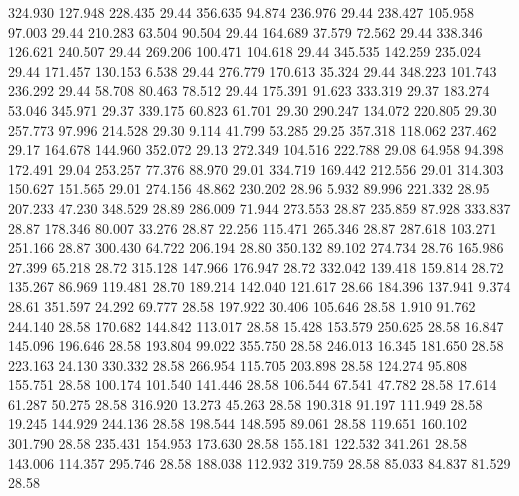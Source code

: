  324.930  127.948  228.435        29.44
 356.635   94.874  236.976        29.44
 238.427  105.958   97.003        29.44
 210.283   63.504   90.504        29.44
 164.689   37.579   72.562        29.44
 338.346  126.621  240.507        29.44
 269.206  100.471  104.618        29.44
 345.535  142.259  235.024        29.44
 171.457  130.153    6.538        29.44
 276.779  170.613   35.324        29.44
 348.223  101.743  236.292        29.44
  58.708   80.463   78.512        29.44
 175.391   91.623  333.319        29.37
 183.274   53.046  345.971        29.37
 339.175   60.823   61.701        29.30
 290.247  134.072  220.805        29.30
 257.773   97.996  214.528        29.30
   9.114   41.799   53.285        29.25
 357.318  118.062  237.462        29.17
 164.678  144.960  352.072        29.13
 272.349  104.516  222.788        29.08
  64.958   94.398  172.491        29.04
 253.257   77.376   88.970        29.01
 334.719  169.442  212.556        29.01
 314.303  150.627  151.565        29.01
 274.156   48.862  230.202        28.96
   5.932   89.996  221.332        28.95
 207.233   47.230  348.529        28.89
 286.009   71.944  273.553        28.87
 235.859   87.928  333.837        28.87
 178.346   80.007   33.276        28.87
  22.256  115.471  265.346        28.87
 287.618  103.271  251.166        28.87
 300.430   64.722  206.194        28.80
 350.132   89.102  274.734        28.76
 165.986   27.399   65.218        28.72
 315.128  147.966  176.947        28.72
 332.042  139.418  159.814        28.72
 135.267   86.969  119.481        28.70
 189.214  142.040  121.617        28.66
 184.396  137.941    9.374        28.61
 351.597   24.292   69.777        28.58
 197.922   30.406  105.646        28.58
   1.910   91.762  244.140        28.58
 170.682  144.842  113.017        28.58
  15.428  153.579  250.625        28.58
  16.847  145.096  196.646        28.58
 193.804   99.022  355.750        28.58
 246.013   16.345  181.650        28.58
 223.163   24.130  330.332        28.58
 266.954  115.705  203.898        28.58
 124.274   95.808  155.751        28.58
 100.174  101.540  141.446        28.58
 106.544   67.541   47.782        28.58
  17.614   61.287   50.275        28.58
 316.920   13.273   45.263        28.58
 190.318   91.197  111.949        28.58
  19.245  144.929  244.136        28.58
 198.544  148.595   89.061        28.58
 119.651  160.102  301.790        28.58
 235.431  154.953  173.630        28.58
 155.181  122.532  341.261        28.58
 143.006  114.357  295.746        28.58
 188.038  112.932  319.759        28.58
  85.033   84.837   81.529        28.58
